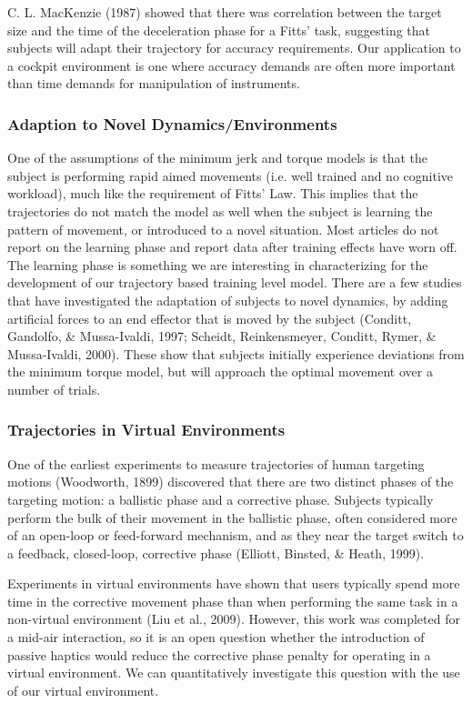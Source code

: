 C. L. MacKenzie (1987) showed that there was correlation between the target size and the time of the deceleration phase for a Fitts' task, suggesting that subjects will adapt their trajectory for accuracy requirements. Our application to a cockpit environment is one where accuracy demands are often more important than time demands for manipulation of instruments.

\subsubsection{Adaption to Novel Dynamics/Environments}\label{adaption-to-novel-dynamicsenvironments}

One of the assumptions of the minimum jerk and torque models is that the subject is performing rapid aimed movements (i.e. well trained and no cognitive workload), much like the requirement of Fitts' Law. This implies that the trajectories do not match the model as well when the subject is learning the pattern of movement, or introduced to a novel situation. Most articles do not report on the learning phase and report data after training effects have worn off. The learning phase is something we are interesting in characterizing for the development of our trajectory based training level model. There are a few studies that have investigated the adaptation of subjects to novel dynamics, by adding artificial forces to an end effector that is moved by the subject (Conditt, Gandolfo, \& Mussa-Ivaldi, 1997; Scheidt, Reinkensmeyer, Conditt, Rymer, \& Mussa-Ivaldi, 2000). These show that subjects initially experience deviations from the minimum torque model, but will approach the optimal movement over a number of trials.

\subsubsection{Trajectories in Virtual Environments}\label{trajectories-in-virtual-environments}

One of the earliest experiments to measure trajectories of human targeting motions (Woodworth, 1899) discovered that there are two distinct phases of the targeting motion: a ballistic phase and a corrective phase. Subjects typically perform the bulk of their movement in the ballistic phase, often considered more of an open-loop or feed-forward mechanism, and as they near the target switch to a feedback, closed-loop, corrective phase (Elliott, Binsted, \& Heath, 1999).

Experiments in virtual environments have shown that users typically spend more time in the corrective movement phase than when performing the same task in a non-virtual environment (Liu et al., 2009). However, this work was completed for a mid-air interaction, so it is an open question whether the introduction of passive haptics would reduce the corrective phase penalty for operating in a virtual environment. We can quantitatively investigate this question with the use of our virtual environment.

